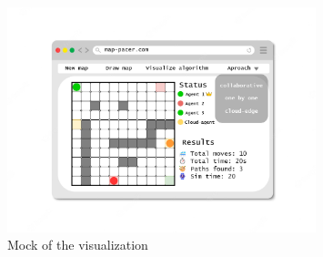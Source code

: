 \begin{figure}[H]
    \centering
    \includegraphics[width=0.8\textwidth]{pictures/frontenf_mock.png}
    \caption{ Mock of the visualization }
    \label{fig:vis_mock}
\end{figure}